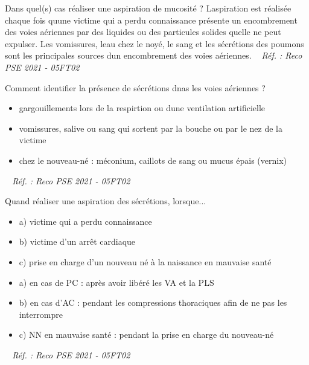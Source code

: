 \documentclass[grid,avery5371,landscape]{flashcards}
\makeatletter
\newcounter{nocarte}
\newcommand{\categ}[1]{%
  \def\@categ{#1}%
  \setcounter{nocarte}{0}%
}
\newcommand{\source}[1]{%
  \medskip
  \itshape%
   ~ \hfill Réf. : #1}
\makeatother
\begin{document}
\color[HTML]{003273}
\categ{PSE}
\begin{flashcard}[CAT]{
 Dans quel(s) cas réaliser une aspiration de mucosité ?   }
  Laspiration est réalisée chaque fois quune victime qui a perdu connaissance présente un encombrement des voies aériennes par des liquides ou des particules solides quelle ne peut expulser. Les vomissures, leau chez le noyé, le sang et les sécrétions des poumons sont les principales sources dun encombrement des voies aériennes.
  \source{Reco PSE 2021 - 05FT02}
\end{flashcard}


\color[HTML]{003273}
\categ{PSE}
\begin{flashcard}[bilan]{
 Comment identifier la présence de sécrétions dnas les voies aériennes ?   }
  \begin{itemize}
\item gargouillements lors de la respirtion ou dune ventilation artificielle
\item vomissures, salive ou sang qui sortent par la bouche ou par le nez de la victime
\item chez le nouveau-né : méconium, caillots de sang ou mucus épais (vernix) \end{itemize}
  \source{Reco PSE 2021 - 05FT02}
\end{flashcard}


\color[HTML]{003273}
\categ{PSE}
\begin{flashcard}[CAT]{
 Quand réaliser une aspiration des sécrétions, lorsque... \begin{itemize} \item a) victime qui a perdu connaissance \item b) victime d'un arrêt cardiaque \item c) prise en charge d'un nouveau né à la naissance en mauvaise santé \end{itemize}   }
  \begin{itemize} \item a) en cas de PC : après avoir libéré les VA et la PLS \item b) en cas d'AC : pendant les compressions thoraciques afin de ne pas les interrompre \item c) NN en mauvaise santé : pendant la prise en charge du nouveau-né \end{itemize}
  \source{Reco PSE 2021 - 05FT02}
\end{flashcard}
\end{document}
